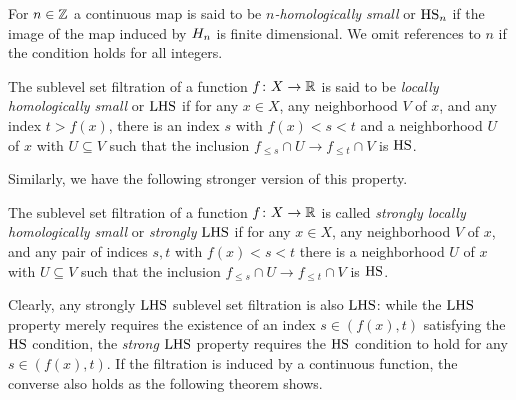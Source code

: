 \begin{defi} \label{defi:local_connectedness}
	For $n \in \mathbb{Z}$ a continuous map is said to be \textit{$n$-homologically small} or $\mathrm{HS}_n$ if the image of the map induced by $H_{n}$ is finite dimensional.
	We omit references to $n$ if the condition holds for all integers.
\end{defi}

\begin{defi} \label{defi:local_connectedness_filtrations}
	The sublevel set filtration of a function $f \colon X \to \mathbb{R}$ is said to be \emph{locally homologically small} or $\mathrm{LHS}$ if for any $x \in X$, any neighborhood $V$ of $x$, and any index $t > f(x)$, there is an index $s$ with  $f(x) < s < t$ and a neighborhood $U$ of $x$ with $U \subseteq V$ such that the inclusion $f_{\leq s} \cap U \to f_{\leq t} \cap V$ is $\mathrm{HS}$.
\end{defi}
Similarly, we have the following stronger version of this property.
\begin{defi}
	The sublevel set filtration of a function $f \colon X \to \mathbb{R}$ is called \emph{strongly locally homologically small} or \emph{strongly $\mathrm{LHS}$} if for any $x \in X$, any neighborhood $V$ of $x$, and any pair of indices $s,t$ with $f(x) < s < t$ there is a neighborhood $U$ of $x$ with $U \subseteq V$ such that the inclusion $f_{\leq s} \cap U \to f_{\leq t} \cap V$ is $\mathrm{HS}$.
\end{defi}

Clearly, any strongly $\mathrm{LHS}$ sublevel set filtration is also $\mathrm{LHS}$:
while the $\mathrm{LHS}$ property merely requires the existence of an index $s \in (f(x),t)$ satisfying the $\mathrm{HS}$ condition, the \emph{strong} $\mathrm{LHS}$ property requires the $\mathrm{HS}$ condition to hold for any $s \in (f(x),t)$.
If the filtration is induced by a continuous function, the converse also holds as the following theorem shows.

